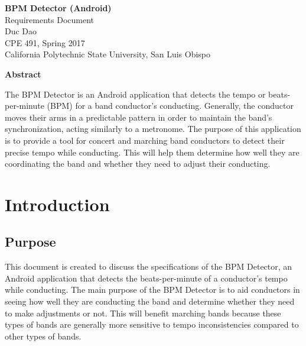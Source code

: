 \documentclass[12pt]{article}
\begin{document}
\begin{center}
  \vspace*{1in}
  \textbf{\LARGE{BPM Detector (Android)}} \\
  \large{Requirements Document \\
  Duc Dao \\
  CPE 491, Spring 2017 \\
  California Polytechnic State University, San Luis Obispo} \\
\end{center}

\begin{center}
  \vspace*{2in}
  \textbf{Abstract} \\
\end{center}
The BPM Detector is an Android application that detects the tempo or beats-per-minute (BPM) for a band conductor's conducting. Generally, the conductor moves their arms in a predictable pattern in order to maintain the band's synchronization, acting similarly to a metronome. The purpose of this application is to provide a tool for concert and marching band conductors to detect their precise tempo while conducting. This will help them determine how well they are coordinating the band and whether they need to adjust their conducting.  

\newpage

\tableofcontents

\newpage

\section{Introduction}
\subsection{Purpose}
This document is created to discuss the specifications of the BPM Detector, an Android application that detects the beats-per-minute of a conductor's tempo while conducting. The main purpose of the BPM Detector is to aid conductors in seeing how well they are conducting the band and determine whether they need to make adjustments or not. This will benefit marching bands because these types of bands are generally more sensitive to tempo inconsistencies compared to other types of bands.
\end{document}
